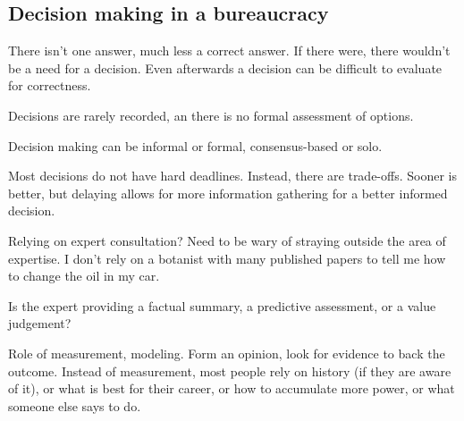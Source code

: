 \subsection{Decision making in a bureaucracy}

There isn't one answer, much less a correct answer. If there were, there wouldn't be a need for a decision. Even afterwards a decision can be difficult to evaluate for correctness.

Decisions are rarely recorded, an there is no formal assessment of options. 

Decision making can be informal or formal, consensus-based or solo. 

Most decisions do not have hard deadlines. Instead, there are trade-offs. Sooner is better, but delaying allows for more information gathering for a better informed decision.


Relying on expert consultation? Need to be wary of straying outside the area of expertise. I don't rely on a botanist with many published papers to tell me how to change the oil in my car. 

Is the expert providing a factual summary, a predictive assessment, or a value judgement? 

Role of measurement, modeling. 
Form an opinion, look for evidence to back the outcome.
Instead of measurement, most people rely on history (if they are aware of it), or what is best for their career, or how to accumulate more power, or what someone else says to do.  